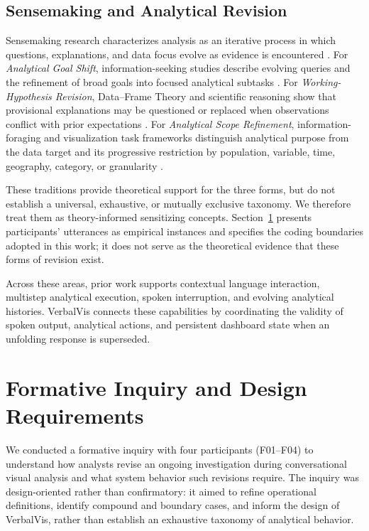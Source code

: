 \documentclass[journal]{IEEEtran}
\begin{document}
\subsection{Sensemaking and Analytical Revision}
\label{sec:rw-sensemaking}

Sensemaking research characterizes analysis as an iterative process in which
questions, explanations, and data focus evolve as evidence is encountered
\cite{russell1993cost,pirolli2005sensemaking,sacha2014knowledge}.
For \emph{Analytical Goal Shift}, information-seeking studies describe evolving
queries and the refinement of broad goals into focused analytical subtasks
\cite{bates1989berrypicking,vakkari2001changes,battle2019characterizing}.
For \emph{Working-Hypothesis Revision}, Data--Frame Theory and scientific
reasoning show that provisional explanations may be questioned or replaced
when observations conflict with prior expectations
\cite{klein2007dataframe,klahr1988dual,chinn1993anomalous}.
For \emph{Analytical Scope Refinement}, information-foraging and visualization
task frameworks distinguish analytical purpose from the data target and its
progressive restriction by population, variable, time, geography, category, or
granularity
\cite{pirolli1999information,brehmer2013multilevel,
wongsuphasawat2016voyager}.

These traditions provide theoretical support for the three forms, but do not
establish a universal, exhaustive, or mutually exclusive taxonomy. We therefore
treat them as theory-informed sensitizing concepts.
Section~\ref{sec:formative} presents participants' utterances as empirical
instances and specifies the coding boundaries adopted in this work; it does
not serve as the theoretical evidence that these forms of revision exist.




Across these areas, prior work supports contextual language interaction,
multistep analytical execution, spoken interruption, and evolving analytical
histories. VerbalVis connects these capabilities by coordinating the validity
of spoken output, analytical actions, and persistent dashboard state when an
unfolding response is superseded.




\section{Formative Inquiry and Design Requirements}
\label{sec:formative}

We conducted a formative inquiry with four participants (F01--F04) to
understand how analysts revise an ongoing investigation during conversational
visual analysis and what system behavior such revisions require. The inquiry
was design-oriented rather than confirmatory: it aimed to refine operational
definitions, identify compound and boundary cases, and inform the design of
VerbalVis, rather than establish an exhaustive taxonomy of analytical
behavior.
\end{document}
